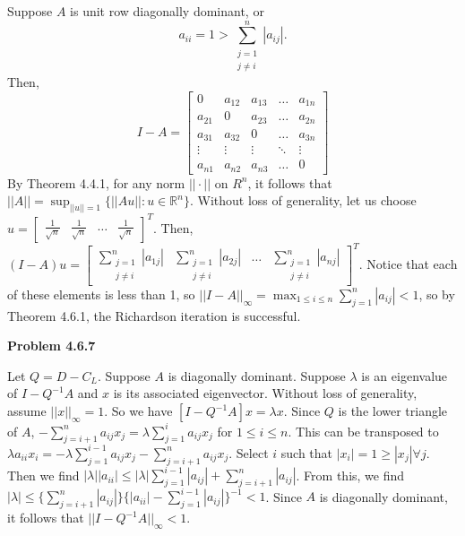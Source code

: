 \documentclass{article}
\def\R{\mathbb{R}}
\newcommand{\Problem}[1]{\textbf{Problem #1}}
\begin{document}
Suppose $A$ is unit row diagonally dominant, or 
\begin{equation*}
a_{ii} = 1 > \displaystyle\sum_{\substack{j = 1\\ j\neq i}}^n |a_{ij}|. 
\end{equation*}
Then, 
\begin{equation*}
I - A = 
\begin{bmatrix}
0 & a_{12} & a_{13} &\hdots & a_{1n}\\
a_{21} & 0 & a_{23} &\hdots & a_{2n}\\
a_{31} & a_{32} & 0 & \hdots & a_{3n}\\
\vdots & \vdots & \vdots & \ddots & \vdots\\
a_{n1} & a_{n2} & a_{n3} & \hdots & 0
\end{bmatrix}
\end{equation*}
By Theorem 4.4.1, for any norm $||\cdot||$ on $R^n$, it follows that $||A|| = \sup_{||u|| = 1}{\{ ||Au|| : u \in \R^n\} }$. Without loss of generality, let us choose $u = \begin{bmatrix} \frac{1}{\sqrt{n}} & \frac{1}{\sqrt{n}} & \hdots & \frac{1}{\sqrt{n}} \end{bmatrix}^T$. Then, $(I-A)u = \begin{bmatrix} \displaystyle\sum_{\substack{j = 1\\ j \neq i}}^n|a_{1j}| & \displaystyle\sum_{\substack{j = 1\\ j \neq i}}^n|a_{2j}| & \hdots & \displaystyle\sum_{\substack{j = 1\\ j \neq i}}^n|a_{nj}| \end{bmatrix}^T$. Notice that each of these elements is less than 1, so $||I - A||_{\infty} = \displaystyle\max_{1 \leq i \leq n} \displaystyle\sum_{j = 1}^n|a_{ij}| < 1$, so by Theorem 4.6.1, the Richardson iteration is successful.

\Problem{4.6.7}

Let $Q = D - C_L$. Suppose $A$ is diagonally dominant. Suppose $\lambda$ is an eigenvalue of $I - Q^{-1}A$ and $x$ is its associated eigenvector. Without loss of generality, assume $||x||_{\infty} = 1$. So we have $[I - Q^{-1}A]x = \lambda x$. Since $Q$ is the lower triangle of $A$, $-\displaystyle\sum_{j = i + 1}^n a_{ij}x_j = \lambda\displaystyle\sum_{j = 1}^i a_{ij}x_j$ for $1 \leq i \leq n$. This can be transposed to $\lambda a_{ii}x_i = -\lambda\displaystyle\sum_{j = 1}^{i-1}a_{ij}x_j - \displaystyle\sum_{j = i+1}^n a_{ij}x_j$. Select $i$ such that $|x_i| = 1 \geq |x_j| \forall j$. Then we find $|\lambda||a_{ii}| \leq |\lambda|\displaystyle\sum_{j=1}^{i-1}|a_{ij}| + \displaystyle\sum_{j = i+1}^n |a_{ij}|$. From this, we find $|\lambda| \leq \{\displaystyle\sum_{j = i+1}^n|a_{ij}|\}\{|a_{ii}| - \displaystyle\sum_{j=1}^{i-1}|a_{ij}|\}^{-1} < 1$. Since $A$ is diagonally dominant, it follows that $||I - Q^{-1}A||_{\infty} < 1$. 
\end{document}
